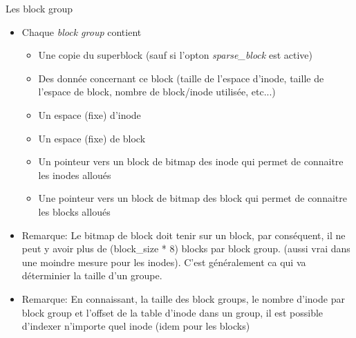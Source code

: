 \begin{frame}[fragile=singleslide]{Les block group}
  \begin{itemize}
  \item Chaque \emph{block group} contient
    \begin{itemize}
    \item    Une    copie    du    superblock   (sauf    si    l'opton
      \emph{sparse\_block} est active)
    \item Des donnée concernant  ce block (taille de l'espace d'inode,
      taille  de l'espace  de block,  nombre de  block/inode utilisée,
      etc...)
    \item Un espace (fixe) d'inode
    \item Un espace (fixe) de block
    \item Un pointeur vers un block  de bitmap des inode qui permet de
      connaitre les inodes alloués
    \item Une pointeur vers un block de bitmap des block qui permet de
      connaitre les blocks alloués
    \end{itemize}
  \item  Remarque: Le bitmap  de block  doit tenir  sur un  block, par
    conséquent, il  ne peut y avoir  plus de (block\_size  * 8) blocks
    par  block group.  (aussi vrai  dans une  moindre mesure  pour les
    inodes).  C'est généralement ca  qui va déterminier la taille d'un
    groupe.
  \item  Remarque: En  connaissant,  la taille  des  block groups,  le
    nombre d'inode  par block  group et l'offset  de la  table d'inode
    dans  un group,  il est  possible d'indexer  n'importe  quel inode
    (idem pour les blocks)
  \end{itemize}
\end{frame}


